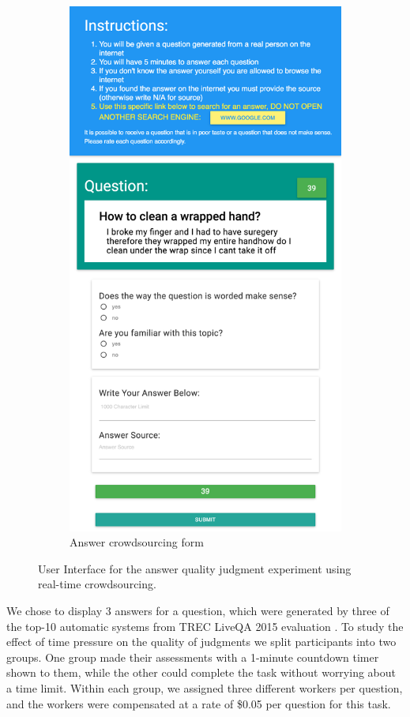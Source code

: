 \begin{figure}
\begin{subfigure}[b]{0.49\textwidth}
\includegraphics[width=0.9\linewidth]{img/answering_screenshot}
\caption{Answer crowdsourcing form}
\label{figure:non-factoid:crowdsourcing:interfaces:answer}
\end{subfigure}

\caption{User Interface for the answer quality judgment experiment using real-time crowdsourcing.}
\label{figure:non-factoid:crowdsourcing:interfaces}
\end{figure}

We chose to display 3 answers for a question, which were generated by three of the top-10 automatic systems from TREC LiveQA 2015 evaluation \cite{overviewliveqa15}.
To study the effect of time pressure on the quality of judgments we split participants into two groups. One group made their assessments with a 1-minute countdown timer shown to them, while the other could complete the task without worrying about a time limit.
Within each group, we assigned three different workers per question, and the workers were compensated at a rate of \$0.05 per question for this task.

